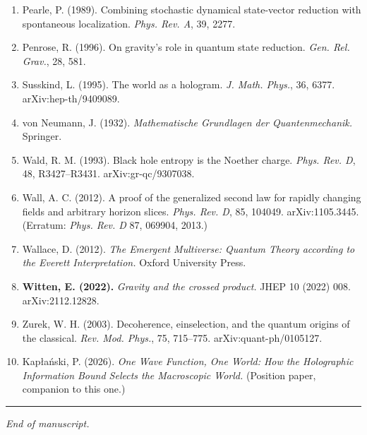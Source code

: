 \documentclass[11pt,a4paper]{article}
\begin{document}
\begin{enumerate}
  \item Pearle, P. (1989). Combining stochastic dynamical state-vector reduction with spontaneous localization. \emph{Phys. Rev. A}, 39, 2277.
  \item Penrose, R. (1996). On gravity's role in quantum state reduction. \emph{Gen. Rel. Grav.}, 28, 581.
  \item Susskind, L. (1995). The world as a hologram. \emph{J. Math. Phys.}, 36, 6377. arXiv:hep-th/9409089.
  \item von Neumann, J. (1932). \emph{Mathematische Grundlagen der Quantenmechanik.} Springer.
  \item Wald, R. M. (1993). Black hole entropy is the Noether charge. \emph{Phys. Rev. D}, 48, R3427–R3431. arXiv:gr-qc/9307038.
  \item Wall, A. C. (2012). A proof of the generalized second law for rapidly changing fields and arbitrary horizon slices. \emph{Phys. Rev. D}, 85, 104049. arXiv:1105.3445. (Erratum: \emph{Phys. Rev. D} 87, 069904, 2013.)
  \item Wallace, D. (2012). \emph{The Emergent Multiverse: Quantum Theory according to the Everett Interpretation.} Oxford University Press.
  \item \textbf{Witten, E. (2022).} \emph{Gravity and the crossed product.} JHEP 10 (2022) 008. arXiv:2112.12828.
  \item Zurek, W. H. (2003). Decoherence, einselection, and the quantum origins of the classical. \emph{Rev. Mod. Phys.}, 75, 715–775. arXiv:quant-ph/0105127.
  \item Kapłański, P. (2026). \emph{One Wave Function, One World: How the Holographic Information Bound Selects the Macroscopic World.} (Position paper, companion to this one.)
\end{enumerate}

\medskip\hrule\medskip

\emph{End of manuscript.}
\end{document}

